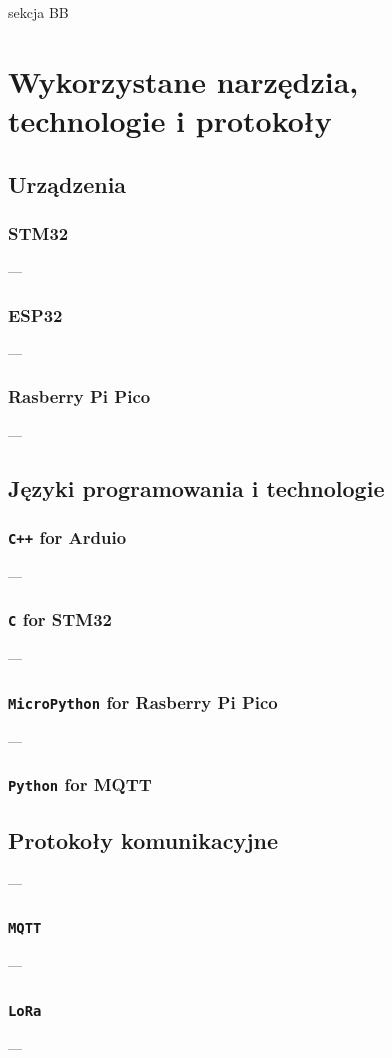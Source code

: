 \documentclass[a4paper,12pt]{book} %
\begin{document}
sekcja BB

\chapter{Wykorzystane narzędzia, technologie i protokoły}

\section{Urządzenia}
\subsection{STM32}
---
\subsection{ESP32}
---
\subsection{Rasberry Pi Pico}
---

\section{Języki programowania i technologie}
\subsection{\texttt{C++} for Arduio}
---
\subsection{\texttt{C} for STM32}
---
\subsection{\texttt{MicroPython} for Rasberry Pi Pico}
---
\subsection{\texttt{Python} for MQTT}

\section{Protokoły komunikacyjne}
---
\subsection{\texttt{MQTT}}
---
\subsection{\texttt{LoRa}}
---
\end{document}
